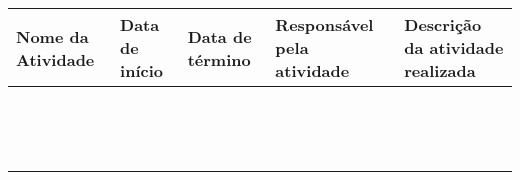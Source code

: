 \documentclass[
landscape,
  a4paper,%
  12pt,%
  english,%
  brazilian,%
]{article}
\begin{document}
 \begin{table}[]
\centering
\begin{tabular}{|l|l|l|l|l|}
\hline
Nome da Atividade & Data de início & Data de término & Responsável pela atividade & Descrição da atividade realizada \\ \hline
                  &                            &                &                 &                                  \\ \hline
                  &                            &                &                 &                                  \\ \hline
                  &                            &                &                 &                                  \\ \hline
                  &                            &                &                 &                                  \\ \hline
                  &                            &                &                 &                                  \\ \hline
                  &                            &                &                 &                                  \\ \hline
                  &                            &                &                 &                                  \\ \hline
                  &                            &                &                 &                                  \\ \hline
                  &                            &                &                 &                                  \\ \hline
                  &                            &                &                 &                                  \\ \hline
                  &                            &                &                 &                                  \\ \hline
                  &                            &                &                 &                                  \\ \hline
                  &                            &                &                 &                                  \\ \hline
                  &                            &                &                 &                                  \\ \hline
\end{tabular}
\end{table}
\end{document}
